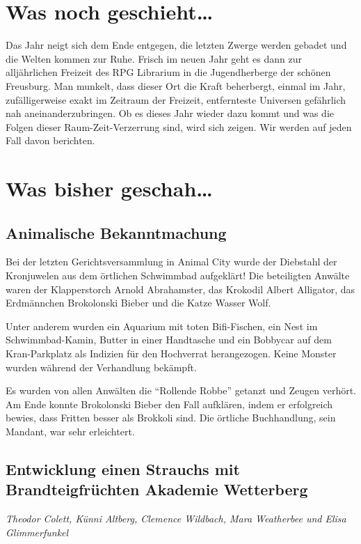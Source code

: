\documentclass[final]{multiversum}
\begin{document}
\makemultititle
%


\section{Was noch geschieht\ldots}
Das Jahr neigt sich dem Ende entgegen, die letzten Zwerge werden gebadet und die
Welten kommen zur Ruhe.  Frisch im neuen Jahr geht es dann zur alljährlichen
Freizeit des RPG Librarium in die Jugendherberge der schönen Freusburg.  Man
munkelt, dass dieser Ort die Kraft beherbergt, einmal im Jahr, zufälligerweise
exakt im Zeitraum der Freizeit, entfernteste Universen gefährlich nah
aneinanderzubringen.  Ob es dieses Jahr wieder dazu kommt und was die Folgen
dieser Raum-Zeit-Verzerrung sind, wird sich zeigen.  Wir werden auf jeden Fall
davon berichten.




\section{Was bisher geschah\ldots}

\subsection{Animalische Bekanntmachung}
Bei der letzten Gerichtsversammlung in Animal City wurde der Diebstahl der
Kronjuwelen aus dem örtlichen Schwimmbad aufgeklärt!  Die beteiligten Anwälte
waren der Klapperstorch Arnold Abrahamster, das Krokodil Albert Alligator, das
Erdmännchen Brokolonski Bieber und die Katze Wasser Wolf.

Unter anderem wurden
ein Aquarium mit toten Bifi-Fischen, ein Nest im Schwimmbad-Kamin, Butter in
einer Handtasche und ein Bobbycar auf dem Kran-Parkplatz als Indizien für den
Hochverrat herangezogen.  Keine Monster wurden während der Verhandlung bekämpft.

Es wurden von allen Anwälten die \enquote{Rollende Robbe} getanzt und Zeugen
verhört.  Am Ende konnte Brokolonski Bieber den Fall aufklären, indem er
erfolgreich bewies, dass Fritten besser als Brokkoli sind.  Die örtliche
Buchhandlung, sein Mandant, war sehr erleichtert.

\subsection{Entwicklung einen Strauchs mit
Brandteigfrüchten \textemdash{} Akademie Wetterberg}
\emph{Theodor Colett, Künni Altberg, Clemence Wildbach,
Mara Weatherbee und Elisa Glimmerfunkel}
\end{document}
